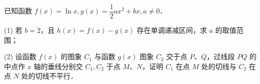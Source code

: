 \begin{question}
已知函数 $f(x) = \ln x, g(x) = \dfrac{1}{2}ax^2 + bx, a \neq 0$．

(1) 若 $b = 2$，且 $h(x) = f(x) - g(x)$ 存在单调递减区间，求 $a$ 的取值范围；

(2) 设函数 $f(x)$ 的图象 $C_1$ 与函数 $g(x)$ 图象 $C_2$ 交于点 $P$、$Q$，过线段 $PQ$ 的中点作 $x$ 轴的垂线分别交 $C_1, C_2$ 于点 $M$、$N$，证明 $C_1$ 在点 $M$ 处的切线与 $C_2$ 在点 $N$ 处的切线不平行．

\end{question}